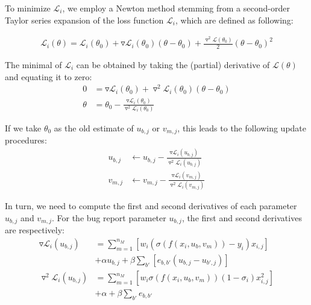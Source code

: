 To minimize $\mathcal{L}_i$, we employ a Newton method \cite{doi:10.1137/1.9780898718898} stemming from a second-order Taylor series expansion of the loss function $\mathcal{L}_i$, which are defined as following:

\begin{align}
\label{eq:newton}
	\mathcal{L}_i(\theta) = \mathcal{L}_i(\theta_0) + \triangledown \mathcal{L}_i(\theta_0) (\theta - \theta_0) + \frac{\triangledown^2 \mathcal{L}(\theta_0)}{2} (\theta - \theta_0)^2
\end{align}

The minimal of $\mathcal{L}_i$ can be obtained by taking the (partial) derivative of $\mathcal{L}(\theta)$ and equating it to zero:
\begin{align}
0 &= \triangledown \mathcal{L}_i(\theta_0) + \triangledown^2 \mathcal{L}_i(\theta_0) (\theta - \theta_0) \nonumber\\
\theta &= \theta_0 - \frac{\triangledown \mathcal{L}_i(\theta_0)}{\triangledown^2 \mathcal{L}_i(\theta_0)}
\end{align}

If we take $\theta_0$ as the old estimate of $u_{b,j}$ or $v_{m,j}$, this leads to the following update procedures:
\begin{align}
\label{eqn:update_u}
u_{b,j} &\leftarrow u_{b,j} - \frac{ \triangledown \mathcal{L}_i(u_{b,j}) }{ \triangledown^2 \mathcal{L}_i(u_{b,j}) } \\
\label{eqn:update_v}
v_{m,j} &\leftarrow v_{m,j} - \frac{ \triangledown \mathcal{L}_i(v_{m,j}) }{ \triangledown^2 \mathcal{L}_i(v_{m,j}) }
\end{align}

In turn, we need to compute the first and second derivatives of each parameter $u_{b,j}$ and $v_{m,j}$. For the bug report parameter $u_{b,j}$, the first and second derivatives are respectively:
\begin{align}
\label{eqn:grad_u}
\triangledown \mathcal{L}_i(u_{b,j}) &= \sum_{m=1}^{n_{M}} \left[ w_{i} (\sigma(f(x_i, u_b, v_m)) - y_{i}) x_{i,j} \right] \nonumber \\
&+ \alpha u_{b,j} + \beta \sum_{b'} \left[ e_{b,b'} \left( u_{b,j} - u_{b',j} \right) \right] \\
\label{eqn:hess_u}
\triangledown^2 \mathcal{L}_i(u_{b,j}) &= \sum_{m=1}^{n_{M}} \left[ w_{i} \sigma(f(x_i, u_b, v_m)) ( 1 - \sigma_{i}) x_{i,j}^2 \right] \nonumber \\
&+ \alpha + \beta \sum_{b'} e_{b,b'}
\end{align}

